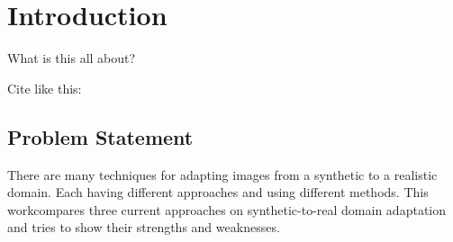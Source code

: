 \chapter{Introduction}
What is this all about?

Cite like this: \cite{NIPS2014_5423}

\section{Problem Statement}
There are many techniques for adapting images from a synthetic to a realistic domain. Each having different approaches and using different methods. This workcompares three current approaches on synthetic-to-real domain adaptation and tries to show their strengths and weaknesses.